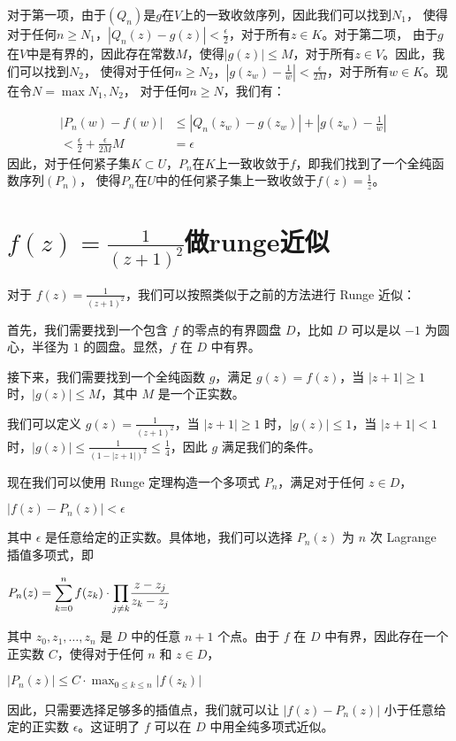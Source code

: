 \documentclass[12pt, a4paper, oneside]{article}
\begin{document}
\begin{spacing}{2.0}
对于第一项，由于$(Q_n)$是$g$在$V$上的一致收敛序列，因此我们可以找到$N_1$，
使得对于任何$n \geq N_1$，$|Q_n(z) - g(z)| < \frac{\epsilon}{2}$，对于所有$z \in K$。对于第二项，
由于$g$在$V$中是有界的，因此存在常数$M$，使得$|g(z)| \leq M$，对于所有$z \in V$。因此，我们可以找到$N_2$，
使得对于任何$n \geq N_2$，$|g(z_w) - \frac{1}{w}| < \frac{\epsilon}{2M}$，对于所有$w \in K$。现在令$N = \displaystyle\max{N_1, N_2}$，
对于任何$n \geq N$，我们有：

\begin{equation}
    \begin{aligned}
        |P_n(w) - f(w)| &\leq |Q_n(z_w) - g(z_w)| + |g(z_w) - \frac{1}{w}|\
        &\\< \frac{\epsilon}{2} + \frac{\epsilon}{2M} M\
        &= \epsilon
    \end{aligned}
    \label{f2}
\end{equation}
因此，对于任何紧子集$K \subset U$，$P_n$在$K$上一致收敛于$f$，即我们找到了一个全纯函数序列$(P_n)$，
使得$P_n$在$U$中的任何紧子集上一致收敛于$f(z) = \frac{1}{z}$。


\section{$f(z) = \frac{1}{(z+1)^2}$做runge近似}
对于 $f(z) = \frac{1}{(z+1)^2}$，我们可以按照类似于之前的方法进行 Runge 近似：

首先，我们需要找到一个包含 $f$ 的零点的有界圆盘 $D$，比如 $D$ 可以是以 $-1$ 为圆心，半径为 $1$ 的圆盘。显然，$f$ 在 $D$ 中有界。

接下来，我们需要找到一个全纯函数 $g$，满足 $g(z) = f(z)$，当 $|z+1| \geq 1$ 时，$|g(z)| \leq M$，其中 $M$ 是一个正实数。

我们可以定义 $g(z) = \frac{1}{(z+1)^2}$，当 $|z+1| \geq 1$ 时，$|g(z)| \leq 1$，当 $|z+1| < 1$ 时，$|g(z)| \leq \frac{1}{(1-|z+1|)^2} \leq \frac{1}{4}$，因此 $g$ 满足我们的条件。

现在我们可以使用 Runge 定理构造一个多项式 $P_n$，满足对于任何 $z \in D$，

\begin{center}
    $|f(z) - P_n(z)|<\epsilon$
\end{center}

其中 $\epsilon$ 是任意给定的正实数。具体地，我们可以选择 $P_n(z)$ 为 $n$ 次 Lagrange 插值多项式，即
\begin{center}
    $P_n(z) = \displaystyle\sum_{k = 0}^{n}f(z_k) \cdot {\textstyle \displaystyle\prod_{j\neq k}}\frac{z - z_j}{z_k - z_j} $
\end{center}
其中 $z_0, z_1, \ldots, z_n$ 是 $D$ 中的任意 $n+1$ 个点。由于 $f$ 在 $D$ 中有界，因此存在一个正实数 $C$，使得对于任何 $n$ 和 $z \in D$，
\begin{center}
    $|P_n(z)|\leq C\cdot \displaystyle\max_{0\leq k\leq n}|f(z_k)| $
\end{center}
因此，只需要选择足够多的插值点，我们就可以让 $|f(z) - P_n(z)|$ 小于任意给定的正实数 $\epsilon$。这证明了 $f$ 可以在 $D$ 中用全纯多项式近似。


\end{spacing}
\end{document}
